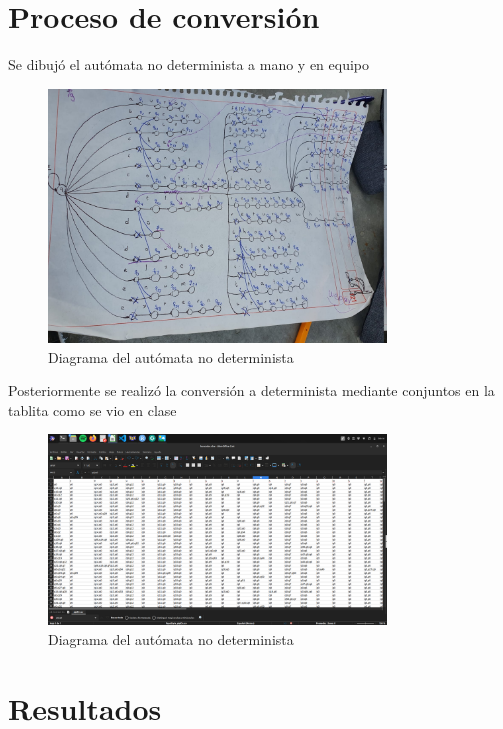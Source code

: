 \documentclass[11pt]{article} %
\begin{document}
	\section{Proceso de conversión}
	
	Se dibujó el autómata no determinista a mano y en equipo
	
	\begin{figure}[H]
		\centering
		\includegraphics[width=0.8\textwidth]{vabien}
		\caption{Diagrama del autómata no determinista}
	\end{figure}
	
	Posteriormente se realizó la conversión a determinista mediante conjuntos en la tablita como se vio en clase
	
	\begin{figure}[H]
		\centering
		\includegraphics[width=0.8\textwidth]{imagen6}
		\caption{Diagrama del autómata no determinista}
	\end{figure}
	
	\section{Resultados}
	
\end{document}
